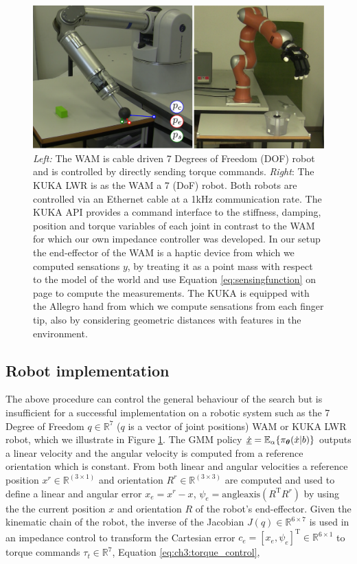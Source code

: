 \begin{figure}
 \centering
 \includegraphics[width=\textwidth]{./ch3-Search/Figures/robots}
 \caption{\textit{Left:} The WAM is cable driven 7 Degrees of Freedom (DOF) robot and is controlled by directly sending torque commands. 
 \textit{Right}: The KUKA LWR is as the WAM a 7 (DoF) robot. Both robots are controlled via an Ethernet cable at a 1kHz communication rate. The KUKA API 
 provides a command interface to the stiffness, damping, position and torque variables of each joint in contrast to the WAM for which our own impedance 
 controller was developed. In our setup the end-effector of the WAM is a haptic device from which we computed sensations $y$, by treating it as a point mass with respect
 to the model of the world and use Equation \ref{eq:sensingfunction} on page \pageref{eq:sensingfunction} to compute the measurements. The KUKA is equipped 
 with the Allegro hand from which we compute sensations from each finger tip, also by considering geometric distances with features in the environment.}
 \label{fig:ch3:wam:kuka}
\end{figure}

\subsection{Robot implementation}

The above procedure can control the general behaviour of the search but is insufficient for a successful implementation on a robotic system 
such as the 7 Degree of Freedom $q\in\mathbb{R}^7$ ($q$ is a vector of joint positions) WAM or KUKA LWR robot, which we illustrate in Figure \ref{fig:ch3:wam:kuka}. 
The GMM policy $\underline{\dot{x}} = \mathbb{E}_{\alpha}\{\pi_{\boldsymbol{\theta}}(\dot{x}|b)\}$ outputs a linear velocity and the 
angular velocity is computed from a reference orientation which is constant. 
From both linear and angular velocities a reference position $x^r \in \mathbb{R}^{(3 \times 1)}$ and orientation $R^r \in \mathbb{R}^{(3 \times 3)}$ are computed and used to 
define a linear and angular error $x_e = x^r - x$, $\psi_e = \mathrm{angleaxis}(R^{\mathrm{T}}R^r)$ by using the  
the current position $x$ and orientation $R$ of the robot's end-effector.
Given the kinematic chain of the robot, the inverse of the Jacobian $J(q) \in \mathbb{R}^{6\times 7}$ is used in an impedance control to transform the 
Cartesian error $c_e = [x_e,\psi_e]^{\mathrm{T}} \in \mathbb{R}^{6 \times 1}$ to torque commands $\tau_t \in \mathbb{R}^7$, Equation \ref{eq:ch3:torque_control},

